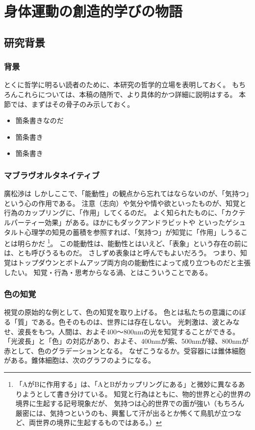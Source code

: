\part{身体運動の創造的学びの物語}
\chapter{研究背景}

\section{背景}
とくに哲学に明るい読者のために、本研究の哲学的立場を表明しておく。
もちろんこれらについては、本稿の随所で、より具体的かつ詳細に説明はする。
本節では、まずはその骨子のみ示しておく。

\begin{itemize}
  \item 箇条書きなのだ
  \item 箇条書き
  \item 箇条書き
\end{itemize}

\section{マブラヴオルタネイティブ}
廣松渉\cite{廣松}は
しかしここで、「能動性」の観点から忘れてはならないのが、「気持つ」という心の作用である。
注意（志向）や気分や情や欲といったものが、知覚と行為のカップリングに、「作用」してくるのだ。
よく知られたものに、「カクテルパーティー効果」がある。ほかにもダックアンドラビットや
といったゲシュタルト心理学の知見の蓄積を参照すれば、「気持つ」が知覚に「作用」しうることは明らかだ
\footnote{
  「AがBに作用する」は、「AとBがカップリングにある」と微妙に異なるありようとして書き分けている。
  知覚と行為はともに、物的世界と心的世界の境界に生起する記号現象だが、
  気持つは心的世界での面が強い（もちろん厳密には、気持つというのも、興奮して汗が出るとか怖くて鳥肌が立つなど、両世界の境界に生起するものではある。）
}。
この能動性は、能動性とはいえど、「表象」という存在の前には、とも呼びうるものだ。
さしずめ表象はと呼んでもよいだろう。
つまり、知覚はトップダウンとボトムアップ両方向の能動性によって成り立つものだと主張したい。
知覚・行為・思考からなる渦、とはこういうことである。

\section{色の知覚}
視覚の原始的な例として、色の知覚を取り上げる。
色とは私たちの意識にのぼる「質」である。色そのものは、世界には存在しない。
光刺激は、波とみなせ、波長をもつ。人間は、およそ400〜800nmの光を知覚することができる。
「光波長」と「色」の対応があり、およそ、400nmが紫、500nmが緑、800nmが赤として、色のグラデーションとなる。
なぜこうなるか。受容器には錐体細胞がある。錐体細胞は、次のグラフのようになる。

